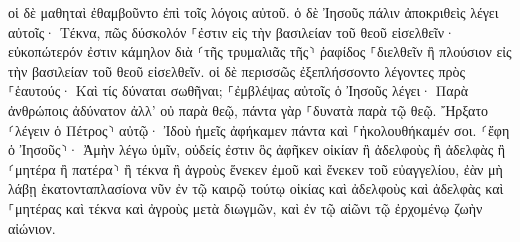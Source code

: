 \documentclass{openreader}
\begin{document}
οἱ δὲ μαθηταὶ ἐθαμβοῦντο ἐπὶ τοῖς λόγοις αὐτοῦ. ὁ δὲ Ἰησοῦς πάλιν ἀποκριθεὶς λέγει αὐτοῖς· Τέκνα, πῶς δύσκολόν ⸀ἐστιν εἰς τὴν βασιλείαν τοῦ θεοῦ εἰσελθεῖν· 
εὐκοπώτερόν ἐστιν κάμηλον διὰ ⸂τῆς τρυμαλιᾶς τῆς⸃ ῥαφίδος ⸀διελθεῖν ἢ πλούσιον εἰς τὴν βασιλείαν τοῦ θεοῦ εἰσελθεῖν. 
οἱ δὲ περισσῶς ἐξεπλήσσοντο λέγοντες πρὸς ⸀ἑαυτούς· Καὶ τίς δύναται σωθῆναι; 
⸀ἐμβλέψας αὐτοῖς ὁ Ἰησοῦς λέγει· Παρὰ ἀνθρώποις ἀδύνατον ἀλλ’ οὐ παρὰ θεῷ, πάντα γὰρ ⸀δυνατὰ παρὰ τῷ θεῷ. 
Ἤρξατο ⸂λέγειν ὁ Πέτρος⸃ αὐτῷ· Ἰδοὺ ἡμεῖς ἀφήκαμεν πάντα καὶ ⸀ἠκολουθήκαμέν σοι. 
⸂ἔφη ὁ Ἰησοῦς⸃· Ἀμὴν λέγω ὑμῖν, οὐδείς ἐστιν ὃς ἀφῆκεν οἰκίαν ἢ ἀδελφοὺς ἢ ἀδελφὰς ἢ ⸂μητέρα ἢ πατέρα⸃ ἢ τέκνα ἢ ἀγροὺς ἕνεκεν ἐμοῦ καὶ ἕνεκεν τοῦ εὐαγγελίου, 
ἐὰν μὴ λάβῃ ἑκατονταπλασίονα νῦν ἐν τῷ καιρῷ τούτῳ οἰκίας καὶ ἀδελφοὺς καὶ ἀδελφὰς καὶ ⸀μητέρας καὶ τέκνα καὶ ἀγροὺς μετὰ διωγμῶν, καὶ ἐν τῷ αἰῶνι τῷ ἐρχομένῳ ζωὴν αἰώνιον. 
\end{document}
